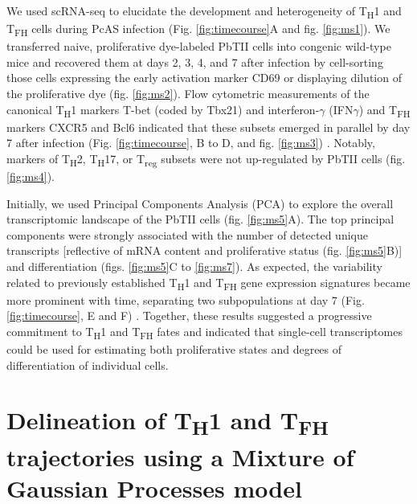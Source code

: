We used scRNA-seq to elucidate the development and heterogeneity of T\textsubscript{H}1 and T\textsubscript{FH} cells during PcAS infection (Fig. \ref{fig:timecourse}A and fig. \ref{fig:ms1}). We transferred naive, proliferative dye-labeled PbTII cells into congenic wild-type mice and recovered them at days 2, 3, 4, and 7 after infection by cell-sorting those cells expressing the early activation marker CD69 or displaying dilution of the proliferative dye (fig. \ref{fig:ms2}). Flow cytometric measurements of the canonical T\textsubscript{H}1 markers T-bet (coded by Tbx21) and interferon-\( \gamma \) (IFN\( \gamma \)) and T\textsubscript{FH} markers CXCR5 and Bcl6 indicated that these subsets emerged in parallel by day 7 after infection (Fig. \ref{fig:timecourse}, B to D, and fig. \ref{fig:ms3}) \cite{Johnston2009-rz, Szabo2000-dh}. Notably, markers of T\textsubscript{H}2, T\textsubscript{H}17, or T\textsubscript{reg} subsets were not up-regulated by PbTII cells (fig. \ref{fig:ms4}).

Initially, we used Principal Components Analysis (PCA) to explore the overall transcriptomic landscape of the PbTII cells (fig. \ref{fig:ms5}A). The top principal components were strongly associated with the number of detected unique transcripts [reflective of mRNA content and proliferative status (fig. \ref{fig:ms5}B)] and differentiation (figs. \ref{fig:ms5}C to \ref{fig:ms7}). As expected, the variability related to previously established T\textsubscript{H}1 and T\textsubscript{FH} gene expression signatures became more prominent with time, separating two subpopulations at day 7 (Fig. \ref{fig:timecourse}, E and F) \cite{Hale2013-yb}. Together, these results suggested a progressive commitment to T\textsubscript{H}1 and T\textsubscript{FH} fates and indicated that single-cell transcriptomes could be used for estimating both proliferative states and degrees of differentiation of individual cells.

\section{Delineation of \texorpdfstring{T\textsubscript{H}1}{TH1} and \texorpdfstring{T\textsubscript{FH}}{TFH} trajectories using a Mixture of Gaussian Processes model}


